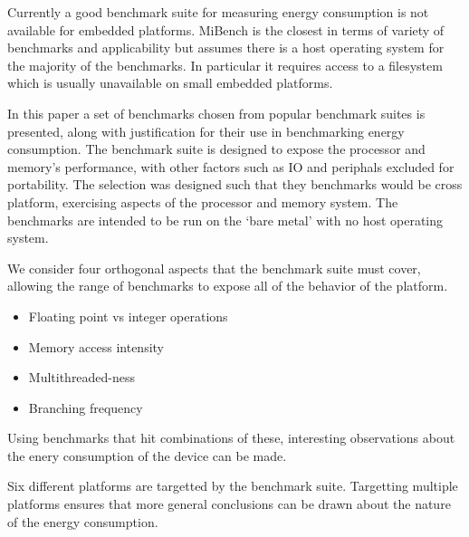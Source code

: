 \documentclass[twocolumn]{article}
\begin{document}
Currently a good benchmark suite for measuring energy consumption is not available for embedded platforms. MiBench is the closest in terms of variety of benchmarks and applicability but assumes there is a host operating system for the majority of the benchmarks. In particular it requires access to a filesystem which is usually unavailable on small embedded platforms.

In this paper a set of benchmarks chosen from popular benchmark suites is presented, along with justification for their use in benchmarking energy consumption. The benchmark suite is designed to expose the processor and memory's performance, with other factors such as IO and periphals excluded for portability. The selection was designed such that they benchmarks would be cross platform, exercising aspects of the processor and memory system. The benchmarks are intended to be run on the ‘bare metal’ with no host operating system.

We consider four orthogonal aspects that the benchmark suite must cover, allowing the range of benchmarks to expose all of the behavior of the platform.

\begin{itemize}
	\setlength{\itemsep}{-0.25em}
	\item Floating point vs integer operations
	\item Memory access intensity
	\item Multithreaded-ness
	\item Branching frequency
\end{itemize}

Using benchmarks that hit combinations of these, interesting observations about the enery consumption of the device can be made.

Six different platforms are targetted by the benchmark suite. Targetting multiple platforms ensures that more general conclusions can be drawn about the nature of the energy consumption.
\end{document}
